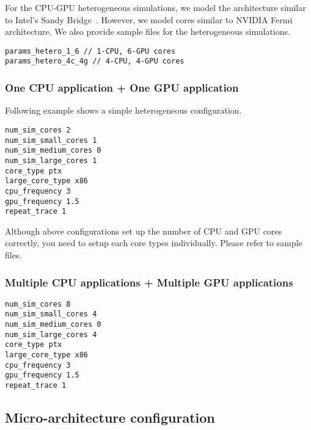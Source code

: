 For the CPU-GPU heterogeneous simulations, we model the architecture
similar to Intel's Sandy Bridge~\cite{sandybridge}. However, we
model \gpu cores similar to NVIDIA Fermi~\cite{fermi} architecture. We
also provide sample files for the heterogeneous simulations.

\begin{Verbatim}
params_hetero_1_6 // 1-CPU, 6-GPU cores
params_hetero_4c_4g // 4-CPU, 4-GPU cores
\end{Verbatim}


\subsubsection{One CPU application + One GPU application}

Following example shows a simple heterogeneous configuration.

\begin{Verbatim}
num_sim_cores 2
num_sim_small_cores 1
num_sim_medium_cores 0
num_sim_large_cores 1
core_type ptx
large_core_type x86
cpu_frequency 3
gpu_frequency 1.5
repeat_trace 1
\end{Verbatim}


Although above configurations set up the number of CPU and GPU cores
correctly, you need to setup each core types individually. Please
refer to sample files.

\subsubsection{Multiple CPU applications + Multiple GPU applications}

\begin{Verbatim}
num_sim_cores 8
num_sim_small_cores 4
num_sim_medium_cores 0
num_sim_large_cores 4
core_type ptx
large_core_type x86
cpu_frequency 3
gpu_frequency 1.5
repeat_trace 1
\end{Verbatim}


\subsection{Micro-architecture configuration}

